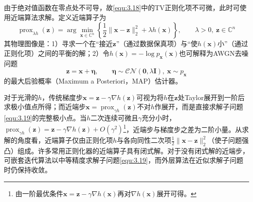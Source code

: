 \documentclass[12pt]{article}
\begin{document}
由于绝对值函数在零点处不可导，故\autoref{equ:3.18}中的TV正则化项不可微，此时可使用近端算法求解。定义近端算子为
\begin{equation}
    \operatorname{prox}_{\lambda h}(\bm{z})=\arg\min_{\bm{x}\in\mathbb{C}^n} \left\{\frac{1}{2}\|\bm{x}-\bm{z}\|_2^2+\lambda h(\bm{x})\right\},\qquad\lambda>0,\ \bm{z}\in\mathbb{C}^n
    \label{equ:3.19}
\end{equation}
其物理图像是：1）寻求一个在“接近$\bm{z}$”（通过数据保真项）与“使$h(\bm{x})$小”（通过正则化项）之间的平衡的解；2）令$h(\bm{x})=-\log p_{\bm{x}}(\bm{x})$也可解释为AWGN去噪问题
\begin{equation}
    \bm{z}=\bm{x}+\bm{\eta},\qquad\bm{\eta}\sim\mathcal{CN}(\bm{0},\lambda\mathbf{I}),\ \bm{x}\sim p_{\bm{x}}
\end{equation}
的最大后验概率（Maximum a Posteriori，MAP）\label{term:MAP}估计器。

对于光滑的$h$，传统梯度步$\bm{x}=\bm{z}-\gamma\nabla h(\bm{z})$可视为将$h$在$\bm{z}$处Taylor展开到一阶后求极小值点所得；而近端步$\bm{x}=\operatorname{prox}_{\gamma h}(\bm{z})$不对$h$作展开，而是直接求解子问题\autoref{equ:3.19}的完整极小点。当$h$二次连续可微且$\gamma$充分小时，$\operatorname{prox}_{\gamma h}(\bm{z})=\bm{z}-\gamma\nabla h(\bm{z})+O(\gamma^2)$\footnote{由一阶最优条件$\bm{x}=\bm{z}-\gamma\nabla h(\bm{x})$再对$\nabla h(\bm{x})$展开可得。}，近端步与梯度步之差为二阶小量。从求解的角度看，近端算子仅由正则化项$h$与各向同性二次项$\frac{1}{2}\|\bm{x}-\bm{z}\|_2^2$（使子问题强凸）组成。许多常用正则化器的近端算子具有闭式解。对于没有闭式解的近端步，可嵌套迭代算法以中等精度求解子问题\autoref{equ:3.19}，而外层算法在近似求解子问题时仍保持收敛。
\end{document}

